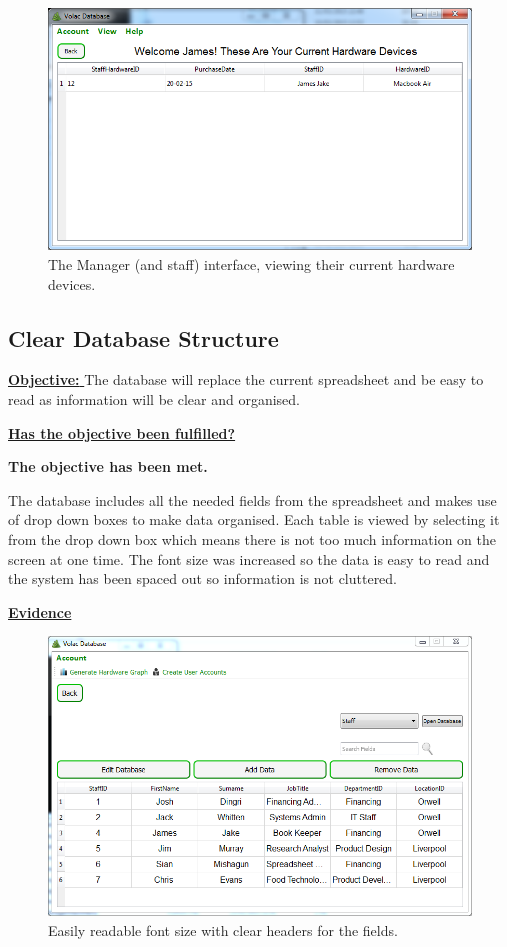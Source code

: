 \begin{figure}[H]
    \includegraphics[width=\textwidth]{./Evaluation/Images/database2.png}
    \caption{The Manager (and staff) interface, viewing their current hardware devices.} \label{fig:db3}
\end{figure}

\subsection{Clear Database Structure}

\underline{\textbf{Objective:} }  The database will replace the current spreadsheet and be easy to read as information will be clear and organised.

\underline{\textbf{Has the objective been fulfilled?}}

\textbf{The objective has been met.}

The database includes all the needed fields from the spreadsheet and makes use of drop down boxes to make data organised. Each table is viewed by selecting it from the drop down box which means there is not too much information on the screen at one time. The font size was increased so the data is easy to read and the system has been spaced out so information is not cluttered.

\underline{\textbf{Evidence}}

\begin{figure}[H]
    \includegraphics[width=\textwidth]{./Evaluation/Images/cleardb1.png}
    \caption{Easily readable font size with clear headers for the fields.}
\end{figure}

